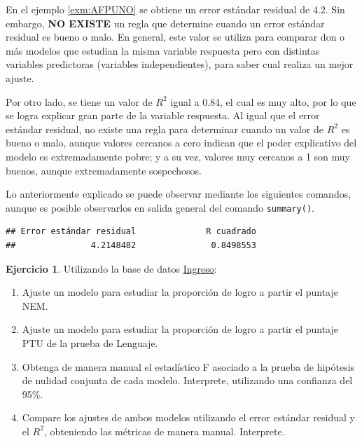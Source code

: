 \documentclass[
  11pt,
]{book}
\newenvironment{Shaded}{\begin{snugshade}}{\end{snugshade}}
\newcommand{\CommentTok}[1]{\textcolor[rgb]{0.56,0.35,0.01}{\textit{#1}}}
\newcommand{\FunctionTok}[1]{\textcolor[rgb]{0.13,0.29,0.53}{\textbf{#1}}}
\newcommand{\NormalTok}[1]{#1}
\newcommand{\OtherTok}[1]{\textcolor[rgb]{0.56,0.35,0.01}{#1}}
\newcommand{\SpecialCharTok}[1]{\textcolor[rgb]{0.81,0.36,0.00}{\textbf{#1}}}
\newcommand{\StringTok}[1]{\textcolor[rgb]{0.31,0.60,0.02}{#1}}
\providecommand{\tightlist}{%
  \setlength{\itemsep}{0pt}\setlength{\parskip}{0pt}}
\theoremstyle{definition}
\theoremstyle{definition}
\theoremstyle{definition}
\newtheorem{exercise}{Ejercicio}[chapter]
\theoremstyle{definition}
\theoremstyle{remark}
\begin{document}
En el ejemplo \ref{exm:AFPUNO} se obtiene un error estándar residual de 4.2. Sin embargo, \textbf{NO EXISTE} un regla que determine cuando un error estándar residual es bueno o malo. En general, este valor se utiliza para comparar don o más modelos que estudian la misma variable respuesta pero con distintas variables predictoras (variables independientes), para saber cual realiza un mejor ajuste.

Por otro lado, se tiene un valor de \(R^2\) igual a 0.84, el cual es muy alto, por lo que se logra explicar gran parte de la variable respuesta. Al igual que el error estándar residual, no existe una regla para determinar cuando un valor de \(R^2\) es bueno o malo, aunque valores cercanos a cero indican que el poder explicativo del modelo es extremadamente pobre; y a su vez, valores muy cercanos a 1 son muy buenos, aunque extremadamente sospechosos.

Lo anteriormente explicado se puede observar mediante los siguientes comandos, aunque es posible observarlos en salida general del comando \texttt{summary()}.

\begin{Shaded}
\end{Shaded}

\begin{verbatim}
## Error estándar residual              R cuadrado 
##               4.2148482               0.8498553
\end{verbatim}

\begin{exercise}

Utilizando la base de datos \hyperref[Ingreso]{Ingreso}:

\begin{enumerate}
\def\labelenumi{\arabic{enumi}.}
\tightlist
\item
  Ajuste un modelo para estudiar la proporción de logro a partir el puntaje NEM.
\item
  Ajuste un modelo para estudiar la proporción de logro a partir el puntaje PTU de la prueba de Lenguaje.
\item
  Obtenga de manera manual el estadístico F asociado a la prueba de hipótesis de nulidad conjunta de cada modelo. Interprete, utilizando una confianza del 95\%.
\item
  Compare los ajustes de ambos modelos utilizando el error estándar residual y el \(R^2\), obteniendo las métricas de manera manual. Interprete.
\end{enumerate}

\end{exercise}
\end{document}
